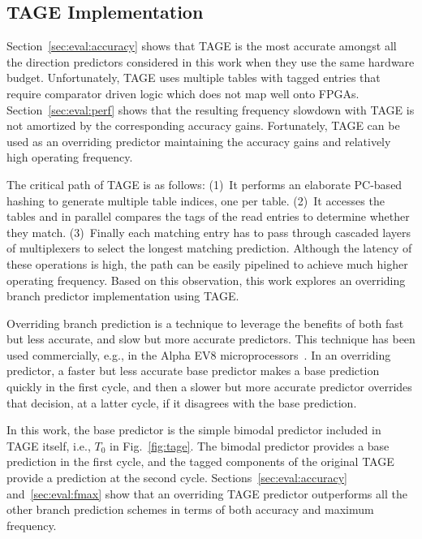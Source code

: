 \documentclass[conference]{IEEEtran}
\begin{document}
\subsection{TAGE Implementation}
\label{sec:fpga:tage}
Section~\ref{sec:eval:accuracy} shows that TAGE is the most accurate amongst all the direction predictors considered in this work when they use the same hardware budget. Unfortunately, TAGE uses multiple tables with tagged entries that require comparator driven logic which does not map well onto FPGAs. Section~\ref{sec:eval:perf} shows that the resulting frequency slowdown with TAGE is not amortized by the corresponding accuracy gains. Fortunately, TAGE can be used as an overriding predictor maintaining the accuracy gains and relatively high operating frequency.

The critical path of TAGE is as follows: (1)~It performs an elaborate PC-based hashing to generate multiple table indices, one per table. (2)~It accesses the tables and in parallel compares the tags of the read entries to determine whether they match. (3)~Finally each matching entry has to pass through cascaded layers of multiplexers to select the longest matching prediction. Although the latency of these operations is high, the path can be easily pipelined to achieve much higher operating frequency. Based on this observation, this work explores an overriding branch predictor implementation using TAGE.

Overriding branch prediction is a technique to leverage the benefits of both fast but less accurate, and slow but more accurate predictors. This technique has been used commercially, e.g., in the Alpha EV8 microprocessors~\cite{alphaEV8}. In an overriding predictor, a faster but less accurate base predictor makes a base prediction quickly in the first cycle, and then a slower but more accurate predictor overrides that decision, at a latter cycle, if it disagrees with the base prediction.

In this work, the base predictor is the simple bimodal predictor included in TAGE itself, i.e., $T_0$ in Fig.~\ref{fig:tage}. The bimodal predictor provides a base prediction in the first cycle, and the tagged components of the original TAGE provide a prediction at the second cycle. Sections~\ref{sec:eval:accuracy} and~\ref{sec:eval:fmax} show that an overriding TAGE predictor outperforms all the other branch prediction schemes in terms of both accuracy and maximum frequency.
\end{document}
